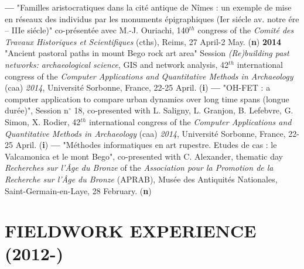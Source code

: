 \documentclass{article}
\begin{document}
\smallbreak
\textbf{---  }"Familles aristocratiques dans la cit\'{e} antique de N\^{i}mes : un exemple de mise en r\'{e}seaux des individus par les monuments \'{e}pigraphiques (Ier si\'{e}cle av. notre \'{e}re -- IIIe si\'{e}cle)" co-pr\'{e}sent\'{e}e avec M.-J. Ouriachi, 140${}^{th}$ congress of the \textit{Comit\'{e} des Travaux Historiques et Scientifiques} (cths), Reims, 27 April-2 May. (\textbf{n})
\smallbreak
\textbf{2014 }"Ancient pastoral paths in mount Bego rock art area" Session \textit{(Re)building past networks: archaeological science}, GIS and network analysis, 42${}^{th}$ international congress of the \textit{Computer Applications and Quantitative Methods in Archaeology }(caa) \textit{2014}, Universit\'{e} Sorbonne, France, 22-25 April. (\textbf{i})\textbf{}
\smallbreak
\textbf{---  }"OH-FET : a computer application to compare urban dynamics over long time spans (longue dur\'{e}e)", Session n$\mathrm{{}^\circ}$ 18, co-presented with L. Saligny, L. Granjon, B. Lefebvre, G. Simon, X. Rodier, 42${}^{th}$ international congress of the \textit{Computer Applications and Quantitative Methods in Archaeology }(caa)\textit{ 2014}, Universit\'{e} Sorbonne, France, 22-25 April. (\textbf{i})
\smallbreak
\textbf{---  }"M\'{e}thodes informatiques en art rupestre. Etudes de cas : le Valcamonica et le mont Bego", co-presented with C. Alexander, thematic day \textit{Recherches sur l'\^{A}ge du Bronze }of the\textit{ Association pour la Promotion de la Recherche sur l'\^{A}ge du Bronze }(APRAB), Mus\'{e}e des Antiquit\'{e}s Nationales, Saint-Germain-en-Laye, 28 February. (\textbf{n})

\section{FIELDWORK EXPERIENCE (2012-)}
\end{document}
